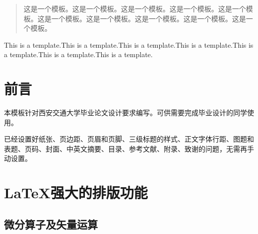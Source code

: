 \documentclass[bachelor]{XJTUthesis}
\begin{document}
\cover


\tableofcontents
\thispagestyle{empty}
\setcounter{page}{0}
\newpage

\begin{abstract}
    这是一个模板。这是一个模板。这是一个模板。这是一个模板。这是一个模板。这是一个模板。这是一个模板。这是一个模板。这是一个模板。这是一个模板。\cite{成永红2001电力设备绝缘检测与诊断}
\end{abstract}
\newpage
\begin{eabstract}
    This is a template.This is a template.This is a template.This is a template.This is a template.This is a template.This is a template.
\end{eabstract}

\chapter{前言}
本模板针对西安交通大学毕业论文设计要求编写。可供需要完成毕业设计的同学使用。\par
已经设置好纸张、页边距、页眉和页脚、三级标题的样式、正文字体行距、图题和表题、页码、封面、中英文摘要、目录、参考文献、附录、致谢的问题，无需再手动设置。

\chapter{\LaTeX 强大的排版功能}
\section{微分算子及矢量运算}
\end{document}
